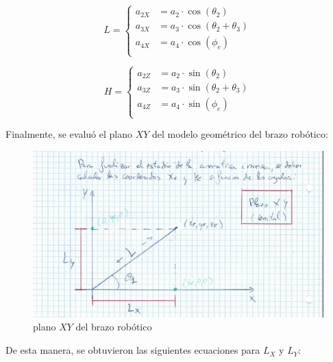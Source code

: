 \documentclass[a4paper,12pt]{article}
\begin{document}
\begin{table}[H]
    \parbox{.45\linewidth}{
        \begin{equation} \label{eq:x_equations}
            L = \left\{\begin{aligned}
                a_{2X} & = a_2 \cdot \cos(\theta_2)            \\
                a_{3X} & = a_3 \cdot \cos(\theta_2 + \theta_3) \\
                a_{4X} & = a_4 \cdot \cos(\phi_e)              \\
            \end{aligned}
            \right.
        \end{equation}
    }
    \hfill
    \parbox{.45\linewidth}{
        \begin{equation} \label{eq:z_equations}
            H = \left\{\begin{aligned}
                a_{2Z} & = a_2 \cdot \sin(\theta_2)            \\
                a_{3Z} & = a_3 \cdot \sin(\theta_2 + \theta_3) \\
                a_{4Z} & = a_4 \cdot \sin(\phi_e)              \\
            \end{aligned}
            \right.
        \end{equation}
    }
\end{table}

Finalmente, se evaluó el plano $XY$ del modelo geométrico del brazo robótico:

\begin{figure}[H]
    \centering
    \includegraphics[width=.8\linewidth]{images/ik_xy_first_approach.png}
    \caption{plano $XY$ del brazo robótico}
    \label{fig:xy_first_approrach}
\end{figure}

De esta manera, se obtuvieron las siguientes ecuaciones para $L_X$ y $L_Y$:
\end{document}
